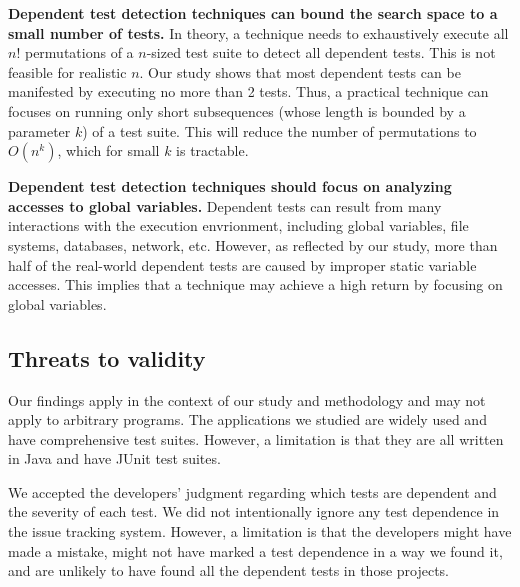 \vspace{1mm}
\noindent \textbf{Dependent test detection techniques
can bound the search space to a small number of tests.}
In theory, a technique needs to exhaustively execute
all $n!$ permutations of a $n$-sized
test suite to detect all dependent tests. This is
not feasible for realistic $n$.  Our study shows that
most dependent tests can be manifested by executing
no more than 2 tests. Thus, a practical technique
can focuses on running only short subsequences (whose
length is bounded by a parameter $k$)
of a test suite. This will reduce the number of permutations
to $O(n^k)$, which for small $k$ is tractable.

\vspace{1mm}
\noindent \textbf{Dependent test detection techniques
should focus on analyzing accesses to global variables.}
Dependent tests can result from many
interactions with the execution envrionment, including
global variables, file systems, databases, network, etc.
However, as reflected by our study, more than half of the
real-world dependent tests are caused
by improper static variable accesses. This implies that a technique
may achieve a high return by focusing on global variables.




\subsection{Threats to validity}

Our findings apply in the context of our study and methodology and may not
apply to arbitrary programs.
The applications we studied are widely used and have comprehensive test suites.
However, a limitation is that they are all written in 
Java and have JUnit test suites.  

We accepted the developers' judgment regarding which tests are dependent
and the severity of each test.  We did not intentionally ignore
any test dependence in the issue tracking system.
However, a limitation is that the developers might have made a mistake,
might not have marked a test dependence in a way we found it, and are
unlikely to have found all the dependent tests in those projects. 


